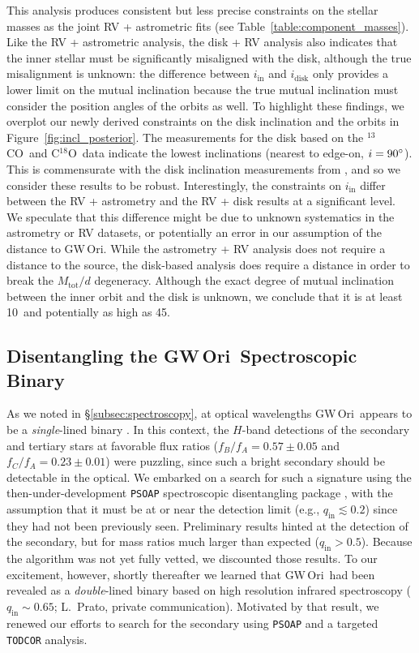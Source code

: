 \documentclass[twocolumn]{aastex61}
\newcommand{\obj}{GW\,Ori}
\newcommand{\thirteen}{${}^{13}$CO}
\newcommand{\eighteen}{C${}^{18}$O}
\begin{document}
This analysis produces consistent but less precise constraints on the stellar masses as the joint RV + astrometric fits (see Table~\ref{table:component_masses}). Like the RV + astrometric analysis, the disk + RV analysis also indicates that the inner stellar must be significantly misaligned with the disk, although the true misalignment is unknown: the difference between $i_\mathrm{in}$ and $i_\mathrm{disk}$ only provides a lower limit on the mutual inclination because the true mutual inclination must consider the position angles of the orbits as well. To highlight these findings, we overplot our newly derived constraints on the disk inclination and the orbits in Figure~\ref{fig:incl_posterior}. The measurements for the disk based on the \thirteen\ and \eighteen\ data indicate the lowest inclinations (nearest to edge-on, $i = 90\mbox{$^\circ$}$). This is commensurate with the disk inclination measurements from \citet{fang17}, and so we consider these results to be robust. Interestingly, the constraints on $i_\mathrm{in}$ differ between the RV + astrometry and the RV + disk results at a significant level. We speculate that this difference might be due to unknown systematics in the astrometry or RV datasets, or potentially an error in our assumption of the distance to \obj. While the astrometry + RV analysis does not require a distance to the source, the disk-based analysis does require a distance in order to break the $M_\mathrm{tot} / d$ degeneracy. Although the exact degree of mutual inclination between the inner orbit and the disk is unknown, we conclude that it is at least 10\degr\ and potentially as high as 45\degr.



\subsection{Disentangling the \obj\ Spectroscopic Binary \label{subsec:disentangle}}

As we noted in \S\ref{subsec:spectroscopy}, at optical wavelengths \obj\ appears to be a \emph{single}-lined binary \citep{mathieu91,fang14}. In this context, the \citet{berger11} $H$-band detections of the secondary and tertiary stars at favorable flux ratios ($f_B / f_A = 0.57 \pm 0.05$ and $f_C / f_A = 0.23 \pm 0.01$) were puzzling, since such a bright secondary should be detectable in the optical. We embarked on a search for such a  signature using the then-under-development \texttt{PSOAP} spectroscopic disentangling package \citep{czekala17}, with the assumption that it must be at or near the detection limit (e.g., $q_\mathrm{in} \lesssim 0.2$) since they had not been previously seen. Preliminary results hinted at the detection of the secondary, but for mass ratios much larger than expected ($q_\mathrm{in} > 0.5$). Because the algorithm was not yet fully vetted, we discounted those results. To our excitement, however, shortly thereafter we learned that \obj\ had been revealed as a \emph{double}-lined binary based on high resolution infrared spectroscopy ($q_\mathrm{in} \sim 0.65$; L.~Prato, private communication). Motivated by that result, we renewed our efforts to search for the secondary using \texttt{PSOAP} and a targeted \texttt{TODCOR} analysis.
\end{document}
